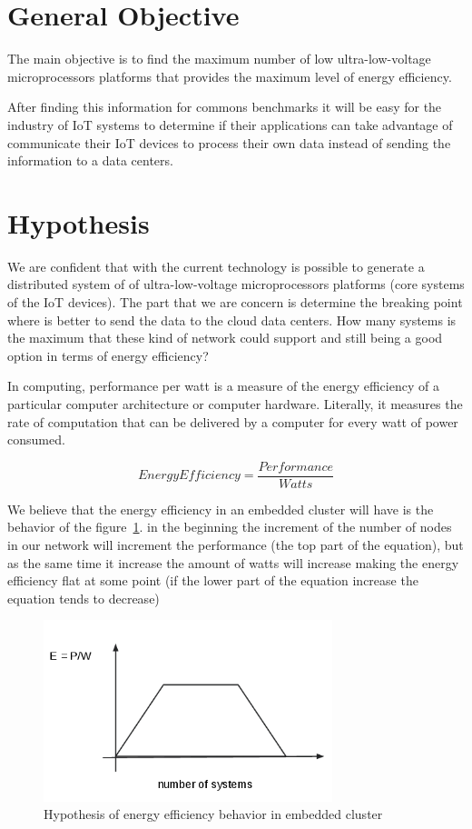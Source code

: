 \section{General Objective}
\noindent

The main objective is to find the maximum number of low ultra-low-voltage
microprocessors platforms that provides the maximum level of energy efficiency.

After finding this information for commons benchmarks it will be easy for the
industry of IoT systems to determine if their applications can take advantage
of communicate their IoT devices to process their own data instead of sending
the information to a data centers.

\section{Hypothesis}
\noindent

We are confident that with the current technology is possible to generate a
distributed system of of ultra-low-voltage microprocessors platforms (core
systems of the IoT devices). The part that we are concern is determine the
breaking point where is better to send the data to the cloud data centers. How
many systems is the maximum that these kind of network could support and still
being a good option in terms of energy efficiency?

In computing, performance per watt is a measure of the energy efficiency of a
particular computer architecture or computer hardware. Literally, it measures
the rate of computation that can be delivered by a computer for every watt of
power consumed.\cite{Burd} 


\begin{equation}
    Energy Efficiency = \dfrac {Performance}{Watts}
\end{equation}

We believe that the energy efficiency in an embedded cluster will have is the
behavior of the  figure~\ref{fig:1.2}. in the beginning the increment of the
number of nodes in our network will increment the performance (the top part of
the equation), but as the same time it increase the amount of watts will
increase making the energy efficiency flat at some point (if the lower part of
the equation increase the equation tends to decrease)


\begin{figure}[H]
\centering
\includegraphics[width=0.75\textwidth]{images/graph_1.png}
\caption{Hypothesis of energy efficiency behavior in embedded cluster}
\label{fig:1.2}
\end{figure}

